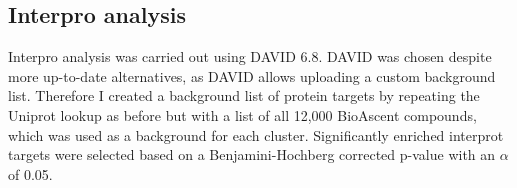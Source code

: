 \documentclass[a4paper,11pt,twoside,openright]{scrbook}
\begin{document}
\subsection{Interpro analysis}
Interpro analysis was carried out using DAVID 6.8. \cite{Huang2009}
DAVID was chosen despite more up-to-date alternatives, as DAVID allows uploading a custom background list.
Therefore I created a background list of protein targets by repeating the Uniprot lookup as before but with a list of all 12,000 BioAscent compounds, which was used as a background for each cluster.
Significantly enriched interprot targets were selected based on a Benjamini-Hochberg corrected p-value with an $\alpha$ of 0.05.



\end{document}
